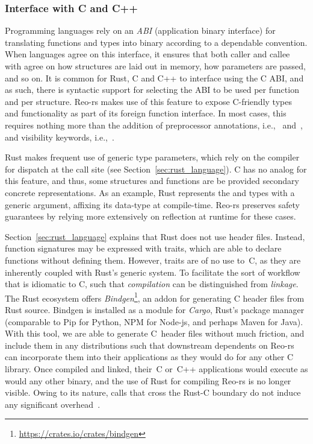 \subsubsection{Interface with C and C++}
Programming languages rely on an \textit{ABI} (application binary interface) for translating functions and types into binary according to a dependable convention. When languages agree on this interface, it ensures that both caller and callee with agree on how structures are laid out in memory, how parameters are passed, and so on. It is common for Rust, C and C++ to interface using the C ABI, and as such, there is syntactic support for selecting the ABI to be used per function and per structure. Reo-rs makes use of this feature to expose C-friendly types and functionality as part of its foreign function interface. In most cases, this requires nothing more than the addition of preprocessor annotations, i.e.,\ \code{\#[repr(C)]} and~\code{\#[no\_mangle]}, and visibility keywords, i.e.,~.

Rust makes frequent use of generic type parameters, which rely on the compiler for dispatch at the call site (see Section~\ref{sec:rust_language}). C has no analog for this feature, and thus, some structures and functions are be provided secondary concrete representations. As an example, Rust represents the  and  types with a generic argument, affixing its data-type at compile-time. Reo-rs preserves safety guarantees by relying more extensively on reflection at runtime for these cases.

Section~\ref{sec:rust_language} explains that Rust does not use header files. Instead, function signatures may be expressed with traits, which are able to declare functions without defining them. However, traits are of no use to~C, as they are inherently coupled with Rust's generic system. To facilitate the sort of workflow that is idiomatic to C, such that \textit{compilation} can be distinguished from \textit{linkage}. The Rust ecosystem offers \textit{Bindgen}\footnote{\url{https://crates.io/crates/bindgen}}, an addon for generating C header files from Rust source. Bindgen is installed as a module for \textit{Cargo}, Rust's package manager (comparable to Pip for Python, NPM for Node-js, and perhaps Maven for Java). With this tool, we are able to generate C~header files without much friction, and include them in any distributions such that downstream dependents on Reo-rs can incorporate them into their applications as they would do for any other C library. Once compiled and linked, their~C or~C++ applications would execute as would any other binary, and the use of Rust for compiling Reo-rs is no longer visible. Owing to its nature, calls that cross the Rust-C boundary do not induce any significant overhead~\cite{klabnik2018rust}.

